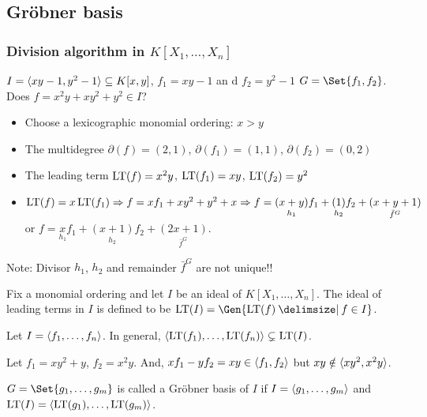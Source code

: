 \subsection{Gr\"{o}bner basis}

\subsubsection{Division algorithm in $K[X_1,\dots,X_n]$}

\begin{example}
  $I = \langle xy-1,y^2-1 \rangle \subseteq K[x,y]$, $f_1 = xy-1$ an
  d $f_2 = y^2-1$ $G=\Set{f_1,f_2}$. Does $f = x^2y+xy^2+y^2 \in I$?
  \begin{itemize}
      \item Choose a lexicographic monomial ordering: $x > y$
      \item The multidegree $\partial(f) = (2,1)$, $\partial(f_1)= (1,1)$,
        $\partial(f_2) = (0,2)$
      \item The leading term $\operatorname{LT}(f) = x^2y$, $\operatorname{LT}(f_1) = xy$, $\operatorname{LT}(f_2) = y^2$
      \item $\operatorname{LT}(f) = x\operatorname{LT}(f_1) \Rightarrow f = xf_1+xy^2+y^2+x \Rightarrow f = \underset{h_1}{(x+y)}f_1+\underset{h_2}{(1)}f_2+\underset{\bar{f}^G}{(x+y+1)}$ or $f = \underset{h_1}{x}f_1+\underset{h_2}{(x+1)}f_2+\underset{\bar{f}^G}{(2x+1)}$.
  \end{itemize}
  Note:  Divisor $h_1$, $h_2$ and remainder $\bar{f}^G$ are not unique!! 
\end{example}

\begin{definition}
  Fix a monomial ordering and let $I$ be an ideal of $K[X_1,\dots,X_n]$.
  The ideal of leading terms in $I$ is defined to be
  $\LT(I) = \Gen{ \LT(f) \given f\in I }$.
\end{definition}

\begin{remark}
  Let $I = \langle f_1,\dots,f_n \rangle$. In general, $\langle\operatorname{LT}(f_1),\dots,\operatorname{LT}(f_n)\rangle
  \subsetneq \operatorname{LT}(I)$.
\end{remark}

\begin{example}
  Let $f_1=xy^2+y$, $f_2=x^2y$. And, $xf_1-yf_2=xy \in \langle f_1,f_2 \rangle$ but
  $xy \notin \langle xy^2, x^2y \rangle$.
\end{example}

\begin{definition}
  $G = \Set{g_1,\dots,g_m}$ is called a Gr\"{o}bner basis of $I$ if
  $I = \langle g_1,\dots,g_m \rangle$ and $\operatorname{LT}(I) = \langle \operatorname{LT}(g_1),\dots,\operatorname{LT}(g_m) \rangle$.
\end{definition}

